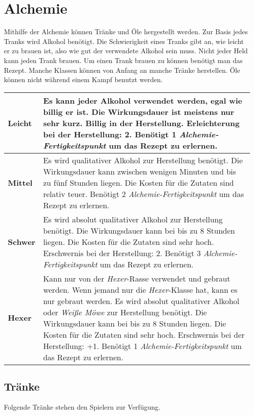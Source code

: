 {\let\clearpage\relax\chapter{Alchemie}}
Mithilfe der Alchemie können Tränke und Öle hergestellt werden. Zur Basis jedes Tranks wird Alkohol benötigt. Die Schwierigkeit eines Tranks gibt an, wie leicht er zu brauen ist, also wie gut der verwendete Alkohol sein muss. Nicht jeder Held kann jeden Trank brauen. Um einen Trank brauen zu können benötigt man das Rezept. Manche Klassen können von Anfang an manche Tränke herstellen. Öle können nicht während einem Kampf benutzt werden.

\begin{tabular}{|p{5cm}|p{10.5cm}|}
\hline
\textbf{Leicht} & Es kann jeder Alkohol verwendet werden, egal wie billig er ist. Die Wirkungsdauer ist meistens nur sehr kurz. Billig in der Herstellung. Erleichterung bei der Herstellung: 2. Benötigt 1 \textit{Alchemie-Fertigkeitspunkt} um das Rezept zu erlernen. \\

\hline
\textbf{Mittel} & Es wird qualitativer Alkohol zur Herstellung benötigt. Die Wirkungsdauer kann zwischen wenigen Minuten und bis zu fünf Stunden liegen. Die Kosten für die Zutaten sind relativ teuer. Benötigt 2 \textit{Alchemie-Fertigkeitspunkt} um das Rezept zu erlernen. \\

\hline
\textbf{Schwer} & Es wird absolut qualitativer Alkohol zur Herstellung benötigt. Die Wirkungsdauer kann bei bis zu 8 Stunden liegen. Die Kosten für die Zutaten sind sehr hoch. Erschwernis bei der Herstellung: 2. Benötigt 3 \textit{Alchemie-Fertigkeitspunkt} um das Rezept zu erlernen. \\

\hline
\textbf{Hexer} & Kann nur von der \textit{Hexer}-Rasse verwendet und gebraut werden. Wenn jemand nur die \textit{Hexer}-Klasse hat, kann es nur gebraut werden. Es wird absolut qualitativer Alkohol oder \textit{Weiße Möwe} zur Herstellung benötigt. Die Wirkungsdauer kann bei bis zu 8 Stunden liegen. Die Kosten für die Zutaten sind sehr hoch. Erschwernis bei der Herstellung: +1. Benötigt 1 \textit{Alchemie-Fertigkeitspunkt} um das Rezept zu erlernen. \\

\hline
\end{tabular}

\section{Tränke}
Folgende Tränke stehen den Spielern zur Verfügung. 

